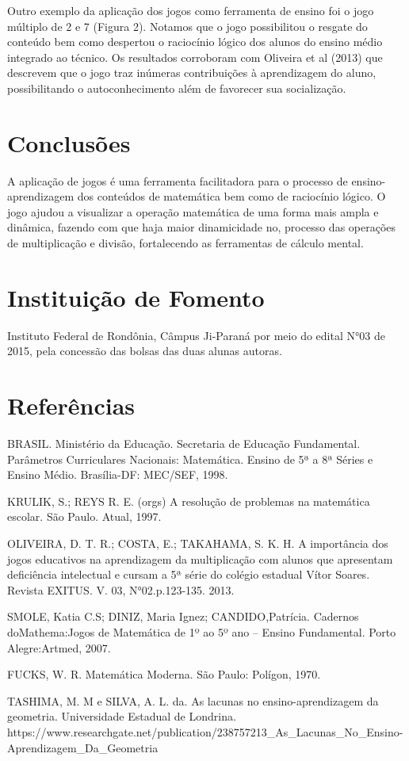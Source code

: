 \documentclass[article,12pt,onesidea,4paper,english,brazil]{abntex2}
\begin{document}
Outro exemplo da aplicação dos jogos como ferramenta de ensino foi o jogo múltiplo de 2 e 7 (Figura 2). Notamos que o jogo possibilitou o resgate do conteúdo bem como despertou o raciocínio lógico dos alunos do ensino médio integrado ao técnico. Os resultados corroboram com Oliveira et al (2013) que descrevem que o jogo traz inúmeras contribuições à aprendizagem do aluno, possibilitando o autoconhecimento além de favorecer sua socialização.
	
	\section*{Conclusões}
	
A aplicação de jogos é uma ferramenta facilitadora para o processo de ensino-aprendizagem dos conteúdos de matemática bem como de raciocínio lógico.
O jogo ajudou a visualizar a operação matemática de uma forma mais ampla e dinâmica, fazendo com que haja maior dinamicidade no, processo das operações de multiplicação e divisão, fortalecendo as ferramentas de cálculo mental.
	
	\section*{Instituição de Fomento}
	
	Instituto Federal de Rondônia, Câmpus Ji-Paraná por meio do edital N°03 de 2015, pela concessão das bolsas das duas alunas autoras.
	

	\section*{Referências}
	
\noindent BRASIL. Ministério da Educação. Secretaria de Educação Fundamental. Parâmetros Curriculares Nacionais: Matemática. Ensino de 5ª a 8ª Séries e Ensino Médio. Brasília-DF: MEC/SEF, 1998.

\noindent KRULIK, S.; REYS R. E. (orgs) A resolução de problemas na matemática escolar. São Paulo. Atual, 1997.

\noindent OLIVEIRA, D. T. R.; COSTA, E.; TAKAHAMA, S. K. H. A importância dos jogos educativos na aprendizagem da multiplicação com alunos que apresentam deficiência intelectual e cursam a 5ª série do colégio estadual Vítor Soares. Revista EXITUS. V. 03, N°02.p.123-135. 2013.

\noindent SMOLE, Katia C.S; DINIZ, Maria Ignez; CANDIDO,Patrícia. Cadernos doMathema:Jogos de Matemática de 1º ao 5º ano – Ensino Fundamental. Porto Alegre:Artmed, 2007.

\noindent FUCKS, W. R. Matemática Moderna. São Paulo: Polígon, 1970.

\noindent TASHIMA, M. M e SILVA, A. L. da. As lacunas no ensino-aprendizagem da geometria. Universidade Estadual de Londrina. https://www.researchgate.net/publication/238757213\_As\_Lacunas\_No\_Ensino-Aprendizagem\_Da\_Geometria
	
\end{document}
